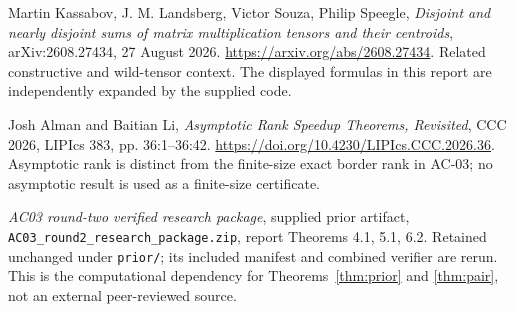 \documentclass[11pt]{article}
\theoremstyle{definition}\newtheorem{definition}[theorem]{Definition}
\theoremstyle{remark}\newtheorem{remark}[theorem]{Remark}
\begin{document}
\begin{enumerate}[label={[\arabic*]},leftmargin=2em]
\item Martin Kassabov, J. M. Landsberg, Victor Souza, Philip Speegle,
\emph{Disjoint and nearly disjoint sums of matrix multiplication tensors and
their centroids}, arXiv:2608.27434, 27 August 2026.
\url{https://arxiv.org/abs/2608.27434}.
Related constructive and wild-tensor context. The displayed formulas in
this report are independently expanded by the supplied code.

\item Josh Alman and Baitian Li, \emph{Asymptotic Rank Speedup Theorems,
Revisited}, CCC 2026, LIPIcs 383, pp. 36:1--36:42.
\url{https://doi.org/10.4230/LIPIcs.CCC.2026.36}.
Asymptotic rank is distinct from the finite-size exact border rank in AC-03;
no asymptotic result is used as a finite-size certificate.

\item \emph{AC03 round-two verified research package}, supplied prior artifact,
\texttt{AC03\_round2\_research\_package.zip}, report Theorems 4.1, 5.1, 6.2.
Retained unchanged under \texttt{prior/}; its included manifest and combined
verifier are rerun. This is the computational dependency for
Theorems~\ref{thm:prior} and \ref{thm:pair}, not an external peer-reviewed source.
\end{enumerate}
\endgroup
\end{document}
